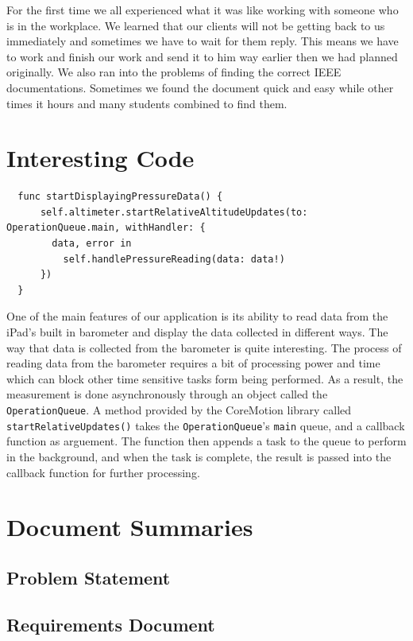 \documentclass[onecolumn, draftclsnofoot,10pt, compsoc]{IEEEtran}
\begin{document}
For the first time we all experienced what it was like working with someone who is in the workplace.
We learned that our clients will not be getting back to us immediately and sometimes we have to wait for them reply.
This means we have to work and finish our work and send it to him way earlier then we had planned originally.
We also ran into the problems of finding the correct IEEE documentations.
Sometimes we found the document quick and easy while other times it hours and many students combined to find them.

\section{Interesting Code}
\begin{lstlisting}
  func startDisplayingPressureData() {
      self.altimeter.startRelativeAltitudeUpdates(to: OperationQueue.main, withHandler: {
        data, error in
          self.handlePressureReading(data: data!)
      })
  }

\end{lstlisting}

One of the main features of our application is its ability to read data from the iPad's built in barometer and display the data collected in different ways.
The way that data is collected from the barometer is quite interesting.
The process of reading data from the barometer requires a bit of processing power and time which can block other time sensitive tasks form being performed.
As a result, the measurement is done asynchronously through an object called the \texttt{OperationQueue}.
A method provided by the CoreMotion library called \texttt{startRelativeUpdates()} takes the \texttt{OperationQueue}'s \texttt{main} queue, and a callback function as arguement.
The function then appends a task to the queue to perform in the background, and when the task is complete, the result is passed into the callback function for further processing.\\

\section{Document Summaries}

\subsection{Problem Statement}

\subsection{Requirements Document}
\end{document}
